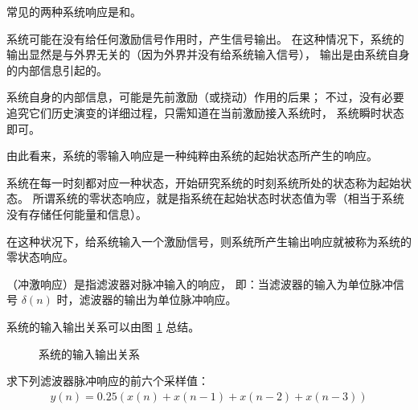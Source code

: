 常见的两种系统响应是和。

\begin{definition}[零输入响应]
    系统可能在没有给任何激励信号作用时，产生信号输出。
    在这种情况下，系统的输出显然是与外界无关的（因为外界并没有给系统输入信号），
    输出是由系统自身的内部信息引起的。

    系统自身的内部信息，可能是先前激励（或挠动）作用的后果；
    不过，没有必要追究它们历史演变的详细过程，只需知道在当前激励接入系统时，
    系统瞬时状态即可。

    由此看来，系统的零输入响应是一种纯粹由系统的起始状态所产生的响应。
\end{definition}

\begin{definition}[零状态响应]
    系统在每一时刻都对应一种状态，开始研究系统的时刻系统所处的状态称为起始状态。
    所谓系统的零状态响应，就是指系统在起始状态时状态值为零（相当于系统没有存储任何能量和信息）。

    在这种状况下，给系统输入一个激励信号，则系统所产生输出响应就被称为系统的零状态响应。
\end{definition}

\begin{definition}
    （冲激响应）是指滤波器对脉冲输入的响应，
    即：当滤波器的输入为单位脉冲信号 $\delta(n)$ 时，滤波器的输出为单位脉冲响应。
\end{definition}

\begin{remark}
    系统的输入输出关系可以由图 \ref{fig:system-input-output} 总结。
    \begin{figure}[H]
        \centering
        \caption{系统的输入输出关系}
        \label{fig:system-input-output}
    \end{figure}
\end{remark}

\begin{example}
    求下列滤波器脉冲响应的前六个采样值：
    \begin{align*}
        y(n) = 0.25(x(n) + x(n - 1) + x(n - 2) + x(n - 3))
    \end{align*}
\end{example}

